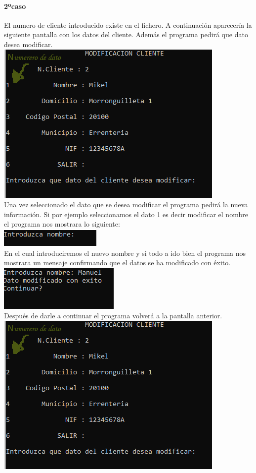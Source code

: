 \documentclass[12pt]{article}
\begin{document}
    \paragraph{2ºcaso}
        El numero de cliente introducido existe en el fichero. A continuación aparecería la siguiente pantalla con los datos del cliente. Además el programa pedirá que dato desea modificar.\\
        \includegraphics[]{ModificacionCliente.PNG}\\
        Una vez seleccionado el dato que se desea modificar el programa pedirá la nueva información. Si por ejemplo seleccionamos el dato 1 es decir modificar el nombre el programa nos mostrara lo siguiente:\\
        \includegraphics[]{ModificacionClienteIntroducirNombre.PNG}\\
        En el cual introduciremos el nuevo nombre y si todo a ido bien el programa nos mostrara un mensaje confirmando que el datos se ha modificado con éxito.\\
        \includegraphics[]{ModificacionClienteNombreIntroducidoConExito.PNG}\\
        Después de darle a continuar el programa volverá a la pantalla anterior.\\
        \includegraphics[]{ModificacionCliente.PNG}\\
\end{document}
